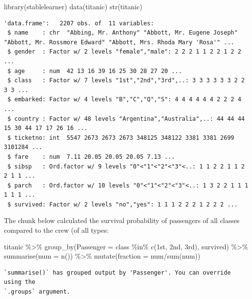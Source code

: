 \documentclass[
  letterpaper,
  DIV=11,
  numbers=noendperiod]{scrreprt}
\newenvironment{Shaded}{\begin{snugshade}}{\end{snugshade}}
\newcommand{\AttributeTok}[1]{\textcolor[rgb]{0.40,0.45,0.13}{#1}}
\newcommand{\FunctionTok}[1]{\textcolor[rgb]{0.28,0.35,0.67}{#1}}
\newcommand{\NormalTok}[1]{\textcolor[rgb]{0.00,0.23,0.31}{#1}}
\newcommand{\SpecialCharTok}[1]{\textcolor[rgb]{0.37,0.37,0.37}{#1}}
\newcommand{\StringTok}[1]{\textcolor[rgb]{0.13,0.47,0.30}{#1}}
\begin{document}
\begin{Shaded}
\begin{Highlighting}[]
\FunctionTok{library}\NormalTok{(stablelearner)}
\FunctionTok{data}\NormalTok{(titanic)}
\FunctionTok{str}\NormalTok{(titanic)}
\end{Highlighting}
\end{Shaded}

\begin{verbatim}
'data.frame':   2207 obs. of  11 variables:
 $ name    : chr  "Abbing, Mr. Anthony" "Abbott, Mr. Eugene Joseph" "Abbott, Mr. Rossmore Edward" "Abbott, Mrs. Rhoda Mary 'Rosa'" ...
 $ gender  : Factor w/ 2 levels "female","male": 2 2 2 1 1 2 2 1 2 2 ...
 $ age     : num  42 13 16 39 16 25 30 28 27 20 ...
 $ class   : Factor w/ 7 levels "1st","2nd","3rd",..: 3 3 3 3 3 3 2 2 3 3 ...
 $ embarked: Factor w/ 4 levels "B","C","Q","S": 4 4 4 4 4 4 2 2 2 4 ...
 $ country : Factor w/ 48 levels "Argentina","Australia",..: 44 44 44 15 30 44 17 17 26 16 ...
 $ ticketno: int  5547 2673 2673 2673 348125 348122 3381 3381 2699 3101284 ...
 $ fare    : num  7.11 20.05 20.05 20.05 7.13 ...
 $ sibsp   : Ord.factor w/ 9 levels "0"<"1"<"2"<"3"<..: 1 1 2 2 1 1 2 2 1 1 ...
 $ parch   : Ord.factor w/ 10 levels "0"<"1"<"2"<"3"<..: 1 3 2 2 1 1 1 1 1 1 ...
 $ survived: Factor w/ 2 levels "no","yes": 1 1 1 2 2 2 1 2 2 2 ...
\end{verbatim}

The chunk below calculated the survival probability of passengers of all
classes compared to the crew (of all types:

\begin{Shaded}
\begin{Highlighting}[]
\NormalTok{titanic }\SpecialCharTok{\%\textgreater{}\%} \FunctionTok{group\_by}\NormalTok{(}\AttributeTok{Passenger =}\NormalTok{ class }\SpecialCharTok{\%in\%} \FunctionTok{c}\NormalTok{(}\StringTok{\textquotesingle{}1st\textquotesingle{}}\NormalTok{, }\StringTok{\textquotesingle{}2nd\textquotesingle{}}\NormalTok{, }\StringTok{\textquotesingle{}3rd\textquotesingle{}}\NormalTok{), survived) }\SpecialCharTok{\%\textgreater{}\%} \FunctionTok{summarise}\NormalTok{(}\AttributeTok{num =} \FunctionTok{n}\NormalTok{()) }\SpecialCharTok{\%\textgreater{}\%} \FunctionTok{mutate}\NormalTok{(}\AttributeTok{fraction =}\NormalTok{ num}\SpecialCharTok{/}\FunctionTok{sum}\NormalTok{(num)) }
\end{Highlighting}
\end{Shaded}

\begin{verbatim}
`summarise()` has grouped output by 'Passenger'. You can override using the
`.groups` argument.
\end{verbatim}
\end{document}
